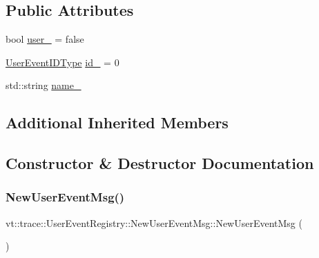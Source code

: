 \subsection*{Public Attributes}
\begin{DoxyCompactItemize}
\item 
bool \hyperlink{structvt_1_1trace_1_1_user_event_registry_1_1_new_user_event_msg_a6317d5623c1edcce684641fe0115824c}{user\+\_\+} = false
\item 
\hyperlink{namespacevt_1_1trace_a5908920d051c144c89f17c69ed262350}{User\+Event\+I\+D\+Type} \hyperlink{structvt_1_1trace_1_1_user_event_registry_1_1_new_user_event_msg_a6e1f863bc07f7edc7e869de47d725acf}{id\+\_\+} = 0
\item 
std\+::string \hyperlink{structvt_1_1trace_1_1_user_event_registry_1_1_new_user_event_msg_a6189fab0f945cd51f56aed0ebcd14ed6}{name\+\_\+}
\end{DoxyCompactItemize}
\subsection*{Additional Inherited Members}


\subsection{Constructor \& Destructor Documentation}
\mbox{\label{structvt_1_1trace_1_1_user_event_registry_1_1_new_user_event_msg_a971f584b592c65f34216ce228eeb9d9a}} 
\subsubsection{\texorpdfstring{New\+User\+Event\+Msg()}{NewUserEventMsg()}\hspace{0.1cm}{\footnotesize\ttfamily [1/2]}}
{\footnotesize\ttfamily vt\+::trace\+::\+User\+Event\+Registry\+::\+New\+User\+Event\+Msg\+::\+New\+User\+Event\+Msg (\begin{DoxyParamCaption}{ }\end{DoxyParamCaption})\hspace{0.3cm}{\ttfamily [default]}}

